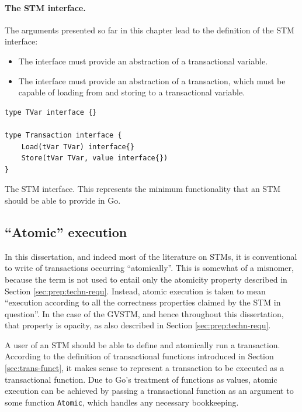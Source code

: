 \documentclass[12pt,a4paper,oneside,openright]{report}
\newcommand{\mycaption}[2]{\caption[#1]{#1 #2}}
\newcommand{\goFunc}[1]{\texttt{#1}}
\begin{document}
\paragraph{The STM interface.} The arguments presented so far in this
chapter lead to the definition of the STM interface:

\begin{itemize}
\item The interface must provide an abstraction of a transactional
  variable.
\item The interface must provide an abstraction of a transaction,
  which must be capable of loading from and storing to a transactional
  variable.
\end{itemize}

\begin{Listing}[hbtp]
\begin{lstlisting}
type TVar interface {}

type Transaction interface {
	Load(tVar TVar) interface{}
	Store(tVar TVar, value interface{})
}
\end{lstlisting}

  \mycaption{The STM interface.}{This represents the minimum
    functionality that an STM should be able to provide in Go.}
  \label{lst:STMInterface}
\end{Listing}

\subsection{``Atomic'' execution}
\label{sec:atomic-function}

In this dissertation, and indeed most of the literature on STMs, it is
conventional to write of transactions occurring ``atomically''. This
is somewhat of a misnomer, because the term is not used to entail only
the atomicity property described in Section
\ref{sec:prep:techn-requ}. Instead, atomic execution is taken to mean
``execution according to all the correctness properties claimed by the
STM in question''. In the case of the GVSTM, and hence throughout this
dissertation, that property is opacity, as also described in Section
\ref{sec:prep:techn-requ}.

A user of an STM should be able to define and atomically run a
transaction. According to the definition of transactional functions
introduced in Section \ref{sec:trans-funct}, it makes sense to
represent a transaction to be executed as a transactional
function. Due to Go's treatment of functions as values, atomic
execution can be achieved by passing a transactional function as an
argument to some function \goFunc{Atomic}, which handles any necessary
bookkeeping.
\end{document}

